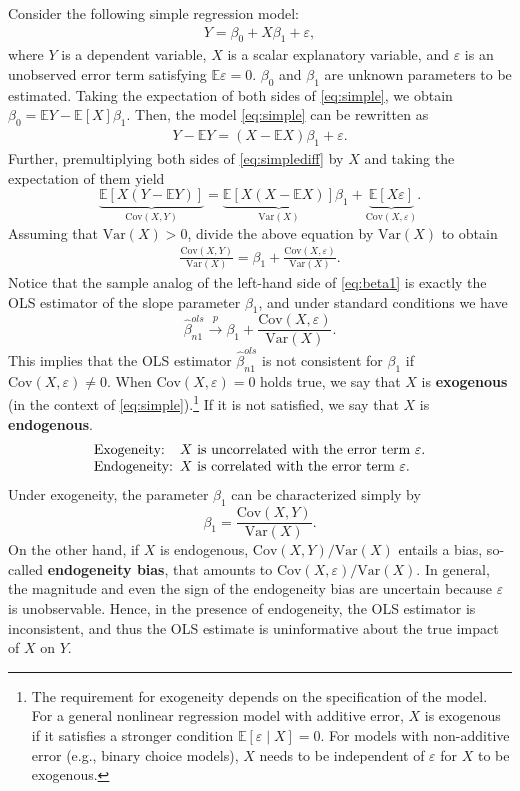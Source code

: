 \documentclass[10.5pt, A4paper, openany, uplatex]{book}
\newcommand{\eps}{\varepsilon}
\newcommand{\E}{\mathbb{E}}
\newcommand{\Var}{\mathrm{Var}}
\newcommand{\Cov}{\mathrm{Cov}}
\renewcommand{\hat}{\widehat}
\numberwithin{equation}{section}
\begin{document}
Consider the following simple regression model:
\begin{align}\label{eq:simple}
Y = \beta_0 + X\beta_1 + \eps,
\end{align}
where $Y$ is a dependent variable, $X$ is a scalar explanatory variable, and $\eps$ is an unobserved error term satisfying $\E \eps = 0$.
$\beta_0$ and $\beta_1$ are unknown parameters to be estimated.
Taking the expectation of both sides of \eqref{eq:simple}, we obtain $\beta_0 = \E Y - \E [X] \beta_1$.
Then, the model \eqref{eq:simple} can be rewritten as
\begin{align}\label{eq:simplediff}
Y - \E Y = (X - \E X)\beta_1 + \eps.
\end{align}
Further, premultiplying both sides of \eqref{eq:simplediff} by $X$ and taking the expectation of them yield
\[
\underbrace{\E[X(Y - \E Y)]}_{\Cov(X,Y)} = \underbrace{\E[X (X - \E X)]}_{\Var(X)} \beta_1 + \underbrace{\E[X \eps]}_{\Cov(X, \eps)}.
\]
Assuming that $\Var(X) > 0$, divide the above equation by $\Var(X)$ to obtain
\begin{align}\label{eq:beta1}
\frac{\Cov(X,Y)}{\Var(X)} = \beta_1 + \frac{\Cov(X,\eps)}{\Var(X)}.
\end{align}
Notice that the sample analog of the left-hand side of \eqref{eq:beta1} is exactly the OLS estimator of the slope parameter $\beta_1$, and under standard conditions we have
\[
	\hat \beta_{n1}^{ols} \overset{p}{\to} \beta_1 + \frac{\Cov(X,\eps)}{\Var(X)}.
\]
This implies that the OLS estimator $\hat \beta_{n1}^{ols} $ is not consistent for $\beta_1$ if $\Cov(X, \eps) \neq 0$.
When $\Cov(X, \eps) = 0$ holds true, we say that $X$ is \textbf{exogenous} (in the context of \eqref{eq:simple}).\footnote{
	The requirement for exogeneity depends on the specification of the model. For a general nonlinear regression model with additive error, $X$ is exogenous if it satisfies a stronger condition $\E[\eps \mid X] = 0$. For models with non-additive error (e.g., binary choice models), $X$ needs to be independent of $\eps$ for $X$ to be exogenous.
}
If it is not satisfied, we say that $X$ is \textbf{endogenous}.
\[
\begin{array}{ll}
\text{Exogeneity:} & \hspace{-5pt}\text{$X$ is uncorrelated with the error term $\eps$.} \\
\text{Endogeneity:} & \hspace{-5pt}\text{$X$ is correlated with the error term $\eps$.} \\
\end{array}
\]
Under exogeneity, the parameter $\beta_1$ can be characterized simply by 
\begin{equation*}
	\beta_1 = \frac{\Cov(X, Y)}{\Var(X) }.
\end{equation*}
On the other hand, if $X$ is endogenous, $\Cov(X, Y)/\Var(X)$ entails a bias, so-called \textbf{endogeneity bias}, that amounts to $\Cov ( X, \eps )/\Var(X)$.
In general, the magnitude and even the sign of the endogeneity bias are uncertain because $\eps$ is unobservable.
Hence, in the presence of endogeneity, the OLS estimator is inconsistent, and thus the OLS estimate is uninformative about the true impact of $X$ on $Y$.
\bigskip
\end{document}

